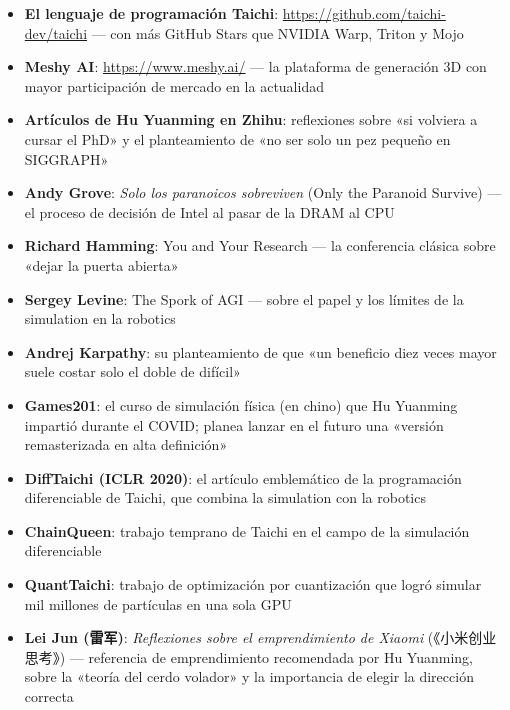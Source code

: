 \documentclass[a4paper]{article}
\begin{document}
\begin{itemize}
\item \textbf{El lenguaje de programación Taichi}: \url{https://github.com/taichi-dev/taichi} — con más GitHub Stars que NVIDIA Warp, Triton y Mojo
\item \textbf{Meshy AI}: \url{https://www.meshy.ai/} — la plataforma de generación 3D con mayor participación de mercado en la actualidad
\item \textbf{Artículos de Hu Yuanming en Zhihu}: reflexiones sobre «si volviera a cursar el PhD» y el planteamiento de «no ser solo un pez pequeño en SIGGRAPH»
\item \textbf{Andy Grove}: \textit{Solo los paranoicos sobreviven} (Only the Paranoid Survive) — el proceso de decisión de Intel al pasar de la DRAM al CPU
\item \textbf{Richard Hamming}: You and Your Research — la conferencia clásica sobre «dejar la puerta abierta»
\item \textbf{Sergey Levine}: The Spork of AGI — sobre el papel y los límites de la simulation en la robotics
\item \textbf{Andrej Karpathy}: su planteamiento de que «un beneficio diez veces mayor suele costar solo el doble de difícil»
\item \textbf{Games201}: el curso de simulación física (en chino) que Hu Yuanming impartió durante el COVID; planea lanzar en el futuro una «versión remasterizada en alta definición»
\item \textbf{DiffTaichi (ICLR 2020)}: el artículo emblemático de la programación diferenciable de Taichi, que combina la simulation con la robotics
\item \textbf{ChainQueen}: trabajo temprano de Taichi en el campo de la simulación diferenciable
\item \textbf{QuantTaichi}: trabajo de optimización por cuantización que logró simular mil millones de partículas en una sola GPU
\item \textbf{Lei Jun (雷军)}: \textit{Reflexiones sobre el emprendimiento de Xiaomi} (《小米创业思考》) — referencia de emprendimiento recomendada por Hu Yuanming, sobre la «teoría del cerdo volador» y la importancia de elegir la dirección correcta
\end{itemize}

\end{document}
